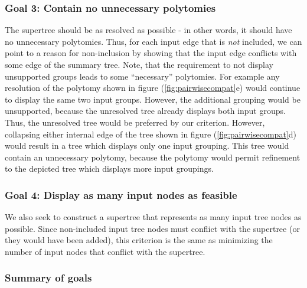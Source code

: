 \documentclass[fleqn,12pt,lineno,english]{wlpeerj}
\begin{document}
\subsubsection{Goal 3: Contain no unnecessary polytomies}

The supertree should be as resolved as possible - in other words,
it should have no unnecessary polytomies. Thus, for each input edge
that is \emph{not} included, we can point to a reason for non-inclusion
by showing that the input edge conflicts with some edge of the summary
tree. Note, that the requirement to not display unsupported groups
leads to some ``necessary'' polytomies. For example any resolution
of the polytomy shown in figure (\ref{fig:pairwisecompat}e) would
continue to display the same two input groups. However, the additional
grouping would be unsupported, because the unresolved tree already
displays both input groups. Thus, the 
unresolved tree would be preferred by our criterion.
However, collapsing either internal edge of the tree shown in figure
(\ref{fig:pairwisecompat}d) would result in a tree which displays
only one input grouping. This tree would contain an unnecessary polytomy,
because the polytomy would permit refinement to the depicted tree
which displays more input groupings.

\subsubsection{Goal 4: Display as many input nodes as feasible}

We also seek to construct a supertree that represents as many input
tree nodes as possible. Since non-included input tree nodes must conflict
with the supertree (or they would have been added), this criterion
is the same as minimizing the number of input nodes that conflict
with the supertree.

\subsubsection{Summary of goals}
\end{document}
